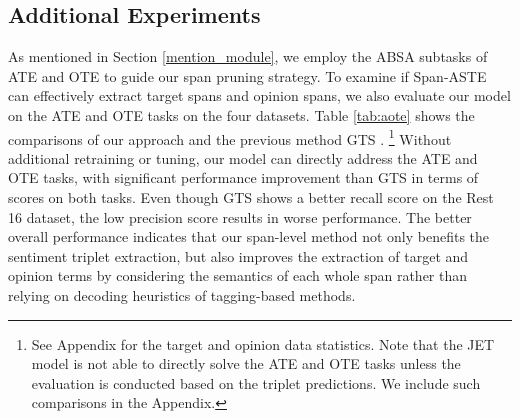 \documentclass[11pt,a4paper]{article}
\begin{document}
\subsection{Additional Experiments}
As mentioned in Section \ref{mention_module}, we employ the ABSA subtasks of ATE and OTE to guide our span pruning strategy. 
To examine if 
Span-ASTE can effectively extract target spans and opinion spans, we also evaluate our model on the ATE and OTE tasks on the four datasets.
Table \ref{tab:aote} shows the comparisons of our approach and the previous method GTS \cite{wu-etal-2020-grid}. \footnote{See Appendix for the target and opinion data statistics.
Note that the JET model \cite{Xu2020PositionAwareTF} is not able to directly solve the ATE and OTE tasks unless the evaluation is conducted based on the triplet predictions.
We include such comparisons in the Appendix.}
Without additional retraining or tuning,
our model can directly address the ATE and OTE tasks, with significant performance improvement than GTS in terms of  scores on both tasks.
Even though GTS shows a better recall score on the Rest 16 dataset, the low precision score results in 
worse  performance.
The better overall performance indicates that our span-level method not only benefits the sentiment triplet extraction,
but also improves the extraction of target and opinion terms by considering the semantics of each whole span rather than relying on decoding heuristics of tagging-based methods.
\end{document}

